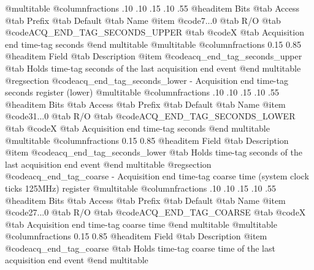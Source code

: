 @multitable @columnfractions .10 .10 .15 .10 .55
@headitem Bits @tab Access @tab Prefix @tab Default @tab Name
@item @code{7...0}
@tab R/O @tab
@code{ACQ_END_TAG_SECONDS_UPPER}
@tab @code{X} @tab 
Acquisition end time-tag seconds
@end multitable
@multitable @columnfractions 0.15 0.85
@headitem Field @tab Description
@item @code{acq_end_tag_seconds_upper} @tab Holds time-tag seconds of the last acquisition end event
@end multitable
@regsection @code{acq_end_tag_seconds_lower} - Acquisition end time-tag seconds register (lower)
@multitable @columnfractions .10 .10 .15 .10 .55
@headitem Bits @tab Access @tab Prefix @tab Default @tab Name
@item @code{31...0}
@tab R/O @tab
@code{ACQ_END_TAG_SECONDS_LOWER}
@tab @code{X} @tab 
Acquisition end time-tag seconds
@end multitable
@multitable @columnfractions 0.15 0.85
@headitem Field @tab Description
@item @code{acq_end_tag_seconds_lower} @tab Holds time-tag seconds of the last acquisition end event
@end multitable
@regsection @code{acq_end_tag_coarse} - Acquisition end time-tag coarse time (system clock ticks 125MHz) register
@multitable @columnfractions .10 .10 .15 .10 .55
@headitem Bits @tab Access @tab Prefix @tab Default @tab Name
@item @code{27...0}
@tab R/O @tab
@code{ACQ_END_TAG_COARSE}
@tab @code{X} @tab 
Acquisition end time-tag coarse time
@end multitable
@multitable @columnfractions 0.15 0.85
@headitem Field @tab Description
@item @code{acq_end_tag_coarse} @tab Holds time-tag coarse time of the last acquisition end event
@end multitable
